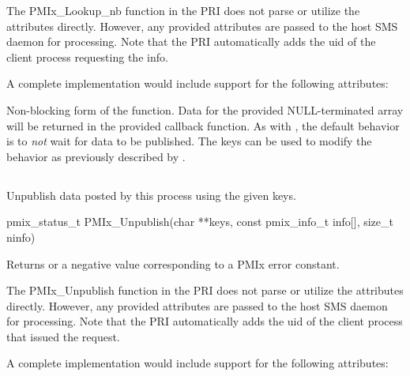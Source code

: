 \priattr
The PMIx_Lookup_nb function in the \ac{PRI} does not parse or utilize the attributes directly. However, any provided attributes are passed to the host \ac{SMS} daemon for processing. Note that the \ac{PRI} automatically adds the uid of the client process requesting the info.

\optattr
A complete implementation would include support for the following attributes:



\descr

Non-blocking form of the  function.
Data for the provided NULL-terminated  array will be returned in the provided callback function.
As with , the default behavior is to \emph{not} wait for data to be published.
The  keys can be used to modify the behavior as previously described by .


\subsection{}

\summary

Unpublish data posted by this process using the given keys.

\format

\cspecificstart
\begin{codepar}
pmix_status_t
PMIx_Unpublish(char **keys,
               const pmix_info_t info[], size_t ninfo)
\end{codepar}
\cspecificend

\begin{arglist}
\end{arglist}

Returns  or a negative value corresponding to a PMIx error constant.

\priattr
The PMIx_Unpublish function in the \ac{PRI} does not parse or utilize the attributes directly. However, any provided attributes are passed to the host \ac{SMS} daemon for processing. Note that the \ac{PRI} automatically adds the uid of the client process that issued the request.

\optattr
A complete implementation would include support for the following attributes:

